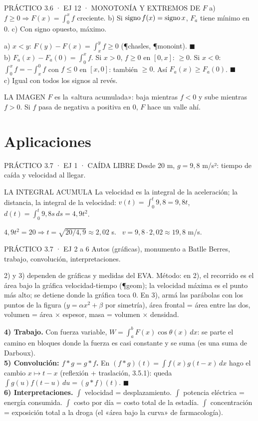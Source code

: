 \begin{enunciado}{PRÁCTICO 3.6 · EJ 12 · MONOTONÍA Y EXTREMOS DE $F$}
a) $f\ge0\Rightarrow F(x)=\int_0^xf$ creciente. b) Si $\operatorname{signo} f(x)=\operatorname{signo} x$, $F_a$ tiene mínimo en 0. c) Con signo opuesto, máximo.
\end{enunciado}
a) $x<y$: $F(y)-F(x)=\int_x^yf\ge0$ (\P{chasles}, \P{monoint}). $\blacksquare$\\
b) $F_a(x)-F_a(0)=\int_0^xf$. Si $x>0$, $f\ge0$ en $[0,x]$: $\ge0$. Si $x<0$: $\int_0^xf=-\int_x^0f$ con $f\le0$ en $[x,0]$: también $\ge0$. Así $F_a(x)\ge F_a(0)$. $\blacksquare$\\
c) Igual con todos los signos al revés.
\begin{tip}{LA IMAGEN}
$F$ es la «altura acumulada»: baja mientras $f<0$ y sube mientras $f>0$. Si $f$ pasa de negativa a positiva en 0, $F$ hace un valle ahí.
\end{tip}

\section{Aplicaciones}

\begin{enunciado}{PRÁCTICO 3.7 · EJ 1 · CAÍDA LIBRE}
Desde 20 m, $g=9{,}8$ m/s²: tiempo de caída y velocidad al llegar.
\end{enunciado}
\begin{uso}{LA INTEGRAL ACUMULA}
La velocidad es la integral de la aceleración; la distancia, la integral de la velocidad: $v(t)=\int_0^t9{,}8=9{,}8t$, \ $d(t)=\int_0^t9{,}8s\,ds=4{,}9t^2$.
\end{uso}
$4{,}9t^2=20\Rightarrow t=\sqrt{20/4{,}9}\approx2{,}02$ s. \ $v=9{,}8\cdot2{,}02\approx19{,}8$ m/s.

\begin{enunciado}{PRÁCTICO 3.7 · EJ 2 a 6}
Autos (gráficas), monumento a Batlle Berres, trabajo, convolución, interpretaciones.
\end{enunciado}
\begin{falta}
2) y 3) dependen de gráficas y medidas del EVA. Método: en 2), el recorrido es el área bajo la gráfica velocidad-tiempo (\P{geom}); la velocidad máxima es el punto más alto; se detiene donde la gráfica toca 0. En 3), armá las parábolas con los puntos de la figura ($y=\alpha x^2+\beta$ por simetría), área frontal = área entre las dos, volumen = área × espesor, masa = volumen × densidad.
\end{falta}
\textbf{4) Trabajo.} Con fuerza variable, $W=\int_a^bF(x)\cos\theta(x)\,dx$: se parte el camino en bloques donde la fuerza es casi constante y se suma (es una suma de Darboux).\\[2pt]
\textbf{5) Convolución: $f*g=g*f$.} En $(f*g)(t)=\int f(x)g(t-x)\,dx$ hago el cambio $x\mapsto t-x$ (reflexión + traslación, 3.5.1): queda $\int g(u)f(t-u)\,du=(g*f)(t)$. $\blacksquare$\\[2pt]
\textbf{6) Interpretaciones.} $\int$ velocidad = desplazamiento. $\int$ potencia eléctrica = energía consumida. $\int$ costo por día = costo total de la estadía. $\int$ concentración = exposición total a la droga (el «área bajo la curva» de farmacología).
